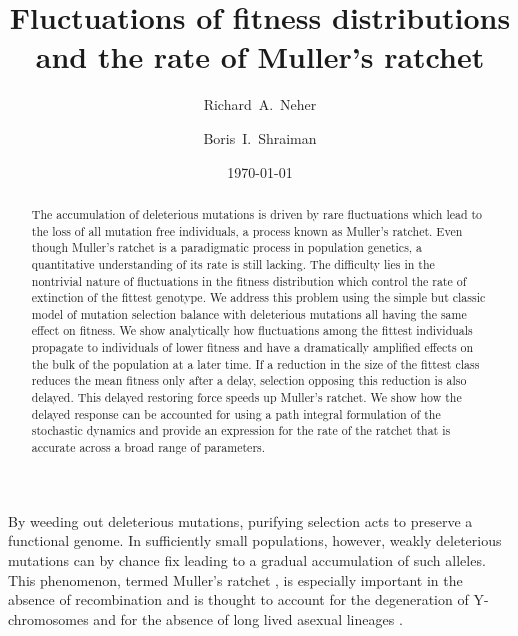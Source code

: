 \documentclass[rmp,preprint]{revtex4}
\begin{document}
\title{Fluctuations of fitness distributions and the rate of Muller's ratchet}
\author{Richard~A.~Neher}
\author{Boris~I.~Shraiman}
\date{\today}

\begin{abstract}
The accumulation of deleterious mutations is driven by rare fluctuations which lead to the loss of all mutation free individuals, a process known as Muller's ratchet. Even though Muller's ratchet is a paradigmatic process in population genetics, a quantitative understanding of its rate is still lacking. The difficulty lies in the nontrivial nature of fluctuations in the fitness distribution which control the rate of extinction of the fittest genotype. We address this problem using the simple but classic model of mutation selection balance with deleterious mutations all having the same effect on fitness. We show analytically how fluctuations among the fittest individuals propagate to individuals of lower fitness and have a dramatically amplified effects on the bulk of the population at a later time. 
If a reduction in the size of the fittest class reduces the mean fitness only after a delay, selection opposing this reduction is also delayed. This delayed restoring force speeds up Muller's ratchet. We show how the delayed response can be accounted for using a path integral formulation of the stochastic dynamics and provide an expression for the rate of the ratchet that is accurate across a broad range of parameters.
\end{abstract}
\maketitle
By weeding out deleterious mutations, purifying selection acts to preserve a functional genome. In sufficiently small populations, however, weakly deleterious mutations can by chance fix leading to a gradual accumulation of such alleles. This phenomenon, termed Muller's ratchet \citep{Muller:1964p45018,Felsenstein:1974p23937}, is especially important in the absence of recombination and is thought to account for the degeneration of Y-chromosomes \citep{Rice:1987p45218} and for the absence of long lived asexual lineages \citep{Lynch:1993p42844}. 
\end{document}
